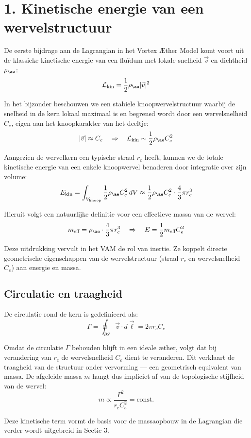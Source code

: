 \section*{1. Kinetische energie van een wervelstructuur}

De eerste bijdrage aan de Lagrangian in het Vortex Æther Model komt voort uit de klassieke kinetische energie van een fluïdum met lokale snelheid $\vec{v}$ en dichtheid $\rho_{\ae}$:
\[
    \mathcal{L}_\text{kin} = \frac{1}{2} \rho_{\ae} |\vec{v}|^2
\]

In het bijzonder beschouwen we een stabiele knoopwervelstructuur waarbij de snelheid in de kern lokaal maximaal is en begrensd wordt door een wervelsnelheid $C_e$, eigen aan het knoopkarakter van het deeltje:
\[
    |\vec{v}| \approx C_e \quad \Rightarrow \quad \mathcal{L}_\text{kin} \sim \frac{1}{2} \rho_{\ae} C_e^2
\]

Aangezien de wervelkern een typische straal $r_c$ heeft, kunnen we de totale kinetische energie van een enkele knoopwervel benaderen door integratie over zijn volume:
\[
    E_\text{kin} = \int_{V_\text{knoop}} \frac{1}{2} \rho_{\ae} C_e^2 \, dV \approx \frac{1}{2} \rho_{\ae} C_e^2 \cdot \frac{4}{3}\pi r_c^3
\]

Hieruit volgt een natuurlijke definitie voor een effectieve massa van de wervel:
\[
    m_\text{eff} = \rho_{\ae} \cdot \frac{4}{3}\pi r_c^3
    \quad \Rightarrow \quad E = \frac{1}{2} m_\text{eff} C_e^2
\]

Deze uitdrukking vervult in het VAM de rol van inertie. Ze koppelt directe geometrische eigenschappen van de wervelstructuur (straal $r_c$ en wervelsnelheid $C_e$) aan energie en massa.

\subsection*{Circulatie en traagheid}
De circulatie rond de kern is gedefinieerd als:
\[
    \Gamma = \oint_{\partial S} \vec{v} \cdot d\vec{\ell} = 2\pi r_c C_e
\]

Omdat de circulatie $\Gamma$ behouden blijft in een ideale æther, volgt dat bij verandering van $r_c$ de wervelsnelheid $C_e$ dient te veranderen. Dit verklaart de traagheid van de structuur onder vervorming — een geometrisch equivalent van massa. De afgeleide massa $m$ hangt dus impliciet af van de topologische stijfheid van de wervel:
\[
    m \propto \frac{\Gamma^2}{r_c C_e^2} = \text{const.}
\]

Deze kinetische term vormt de basis voor de massaopbouw in de Lagrangian die verder wordt uitgebreid in Sectie 3.